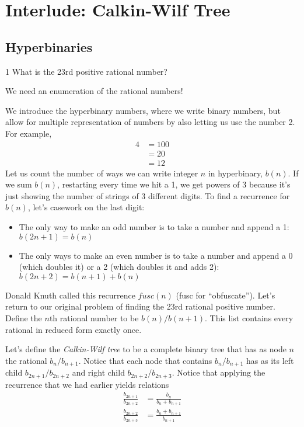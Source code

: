 \label{26-0404}
\section{Interlude: Calkin-Wilf Tree}

\subsection{Hyperbinaries}
\begin{example}1
    What is the 23rd positive rational number?
\end{example}

\begin{solution}
    We need an enumeration of the rational numbers! 
\end{solution}

We introduce the hyperbinary numbers, where we write binary numbers, but
allow for multiple representation of numbers by also letting us use the number 2.
For example,
\begin{align*}
    4 &= 100 \\ &= 20 \\ &= 12
\end{align*}
Let us count the number of ways we can write integer $n$ in hyperbinary, $b(n)$. If
we sum $b(n)$, restarting every time we hit a 1, we get powers of 3 because it’s just
showing the number of strings of 3 different digits. To ﬁnd a recurrence for $b(n)$,
let's casework on the last digit:
\begin{itemize}
    \item The only way to make an odd number is to take a number and append a 1:
    $b(2n + 1) = b(n)$
    \item The only ways to make an even number is to take a number and append a 0
    (which doubles it) or a 2 (which doubles it and adds 2): $b(2n+2) = b(n+1)+b(n)$
\end{itemize}
Donald Knuth called this recurrence $fusc(n)$ (fusc for ``obfuscate''). Let's return to
our original problem of ﬁnding the 23rd rational positive number. Deﬁne the $n$th
rational number to be $b(n)/b(n + 1)$. This list contains every rational in reduced
form exactly once.

Let's deﬁne the \textit{Calkin-Wilf tree} to be a complete binary tree that has as node $n$ the
rational $b_n/b_{n+1}$. Notice that each node that contains $b_n/b_{n+1}$ has as its left child
$b_{2n+1}/b_{2n+2}$ and right child $b_{2n+2}/b_{2n+3}$. Notice that applying the recurrence that
we had earlier yields relations
\begin{align*}
    \frac{b_{2n+1}}{b_{2n+2}} &= \frac{b_n}{b_n + b_{n+1}}\\
    \frac{b_{2n+2}}{b_{2n+3}} &= \frac{b_n + b_{n+1}}{b_{n+1}}
\end{align*}

